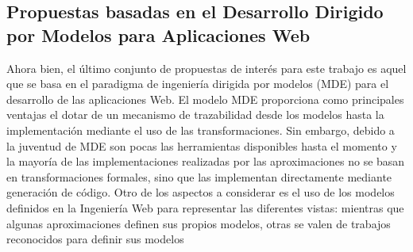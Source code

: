 \subsection {Propuestas basadas en el Desarrollo Dirigido por Modelos para
Aplicaciones Web}

Ahora bien, el último conjunto de propuestas de interés para este trabajo es aquel que se
basa en el paradigma de ingeniería dirigida por modelos (MDE) \cite{MDE} para el
desarrollo de las aplicaciones Web. El modelo MDE proporciona como principales ventajas el
dotar de un mecanismo de trazabilidad desde los modelos hasta la implementación
mediante el uso de las transformaciones. Sin embargo, debido a la juventud de
MDE son pocas las herramientas disponibles hasta el momento y la mayoría de las
implementaciones realizadas por las aproximaciones no se basan en
transformaciones formales, sino que las implementan directamente mediante
generación de código. Otro de los aspectos a considerar es el uso de los modelos
definidos en la Ingeniería Web para representar las diferentes vistas: mientras
que algunas aproximaciones definen sus propios modelos, otras se valen de
trabajos reconocidos para definir sus modelos


